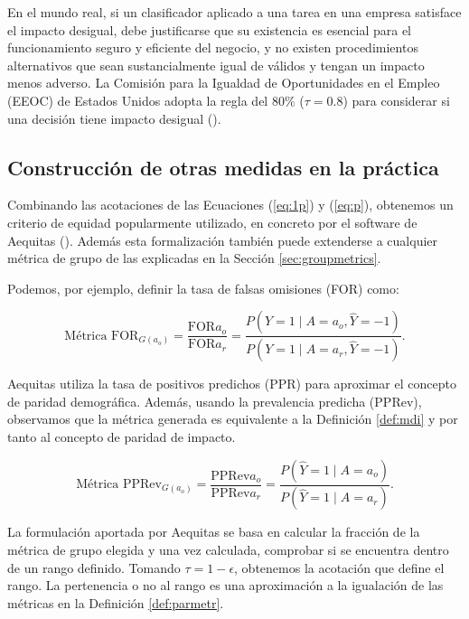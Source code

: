 \documentclass[oneside,openright,titlepage,numbers=noenddot,openany,headinclude,footinclude=true,
cleardoublepage=empty,abstractoff,BCOR=5mm,paper=a4,fontsize=12pt,main=spanish]{scrreprt}
\begin{document}
En el mundo real, si un clasificador aplicado a una tarea en una empresa satisface el impacto desigual, debe justificarse que su existencia es esencial para el funcionamiento seguro y eficiente del negocio, y no existen procedimientos alternativos que sean sustancialmente igual de válidos y tengan un impacto menos adverso. La Comisión para la Igualdad de Oportunidades en el Empleo (EEOC) de Estados Unidos adopta la regla del $80\%$ ($\tau = 0.8$) para considerar si una decisión tiene impacto desigual (\cite{adverse2009}).

\subsection*{Construcción de otras medidas en la práctica}

Combinando las acotaciones de las Ecuaciones (\ref{eq:1p}) y (\ref{eq:p}), obtenemos un criterio de equidad popularmente utilizado, en concreto por el software de Aequitas (\cite{aequitas2019}). Además esta formalización también puede extenderse a cualquier métrica de grupo de las explicadas en la Sección \ref{sec:groupmetrics}.

Podemos, por ejemplo, definir la tasa de falsas omisiones (FOR) como:

\begin{equation*} 
\text{Métrica FOR}_{G(a_o)} =\frac{\text{FOR}{a_o}}{\text{FOR}{a_r}}=\frac{P(Y=1 \mid A=a_o, \hat{Y}=-1)}{P(Y=1 \mid A=a_r, \hat{Y}=-1)}.
\end{equation*}

Aequitas utiliza la tasa de positivos predichos (PPR) para aproximar el concepto de paridad demográfica. Además, usando la prevalencia predicha (PPRev), observamos que la métrica generada es equivalente a la Definición \ref{def:mdi} y por tanto al concepto de paridad de impacto.

\begin{equation*} 
\text{Métrica PPRev}_{G(a_o)}=\frac{\text{PPRev}{a_o}}{\text{PPRev}{a_r}}=\frac{P(\hat{Y}=1 \mid A=a_o)}{P(\hat{Y}=1 \mid A=a_r)}.
\end{equation*}

La formulación aportada por Aequitas se basa en calcular la fracción de la métrica de grupo elegida y una vez calculada, comprobar si se encuentra dentro de un rango definido. Tomando $\tau=1-\epsilon$, obtenemos la acotación que define el rango. La pertenencia o no al rango es una aproximación a la igualación de las métricas en la Definición \ref{def:parmetr}.
\end{document}
